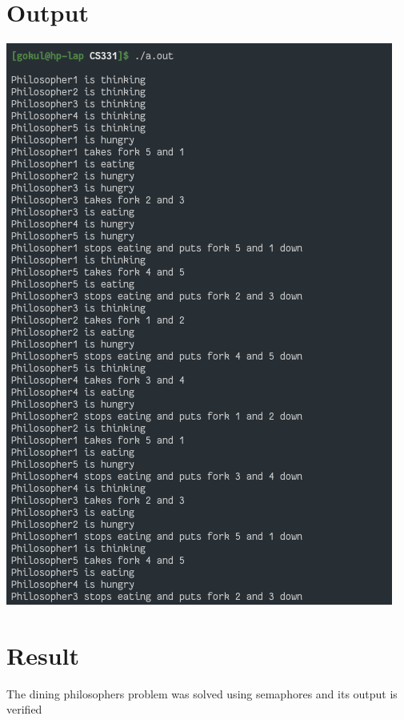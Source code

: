 \documentclass[13pt,oneside]{book}
\begin{document}
    \section*{Output}
    \includegraphics[]{img/p6.png}
    
\Large
\section*{Result}
\large
The dining philosophers problem was solved using semaphores and its output is verified
\end{document}
